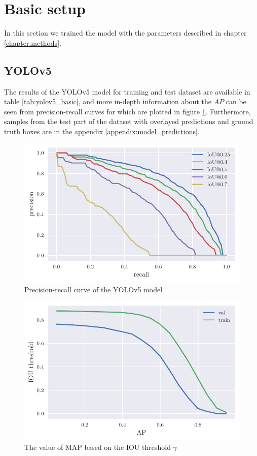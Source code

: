 \section{Basic setup}
In this section we trained the model with the parameters described in chapter \ref{chapter:methods}.
\subsection{YOLOv5}
The results of the YOLOv5 model for training and test dataset are available in table \ref{tab:yolov5_basic}, and more in-depth information about the $AP$ can be seen from precision-recall curves for which are plotted in figure \ref{fig:yolov5_pr_curves}. Furthermore, samples from the test part of the dataset with overlayed predictions and ground truth boxes are in the appendix \ref{appendix:model_predictions}.

\begin{paracol}{2}
    \begin{figure}
        \includegraphics[width=\linewidth]{images/iou_val_multiple.pdf}
        \caption{Precision-recall curve of the YOLOv5 model}
        \label{fig:yolov5_pr_curves}
    \end{figure}
    \switchcolumn
    \begin{figure}
        \includegraphics[width=\linewidth]{images/iou_threshold.pdf}
        \caption{The value of MAP based on the IOU threshold $\gamma$}
        \label{fig:yolov5_map_iou_thresholds}
    \end{figure}
\end{paracol}

